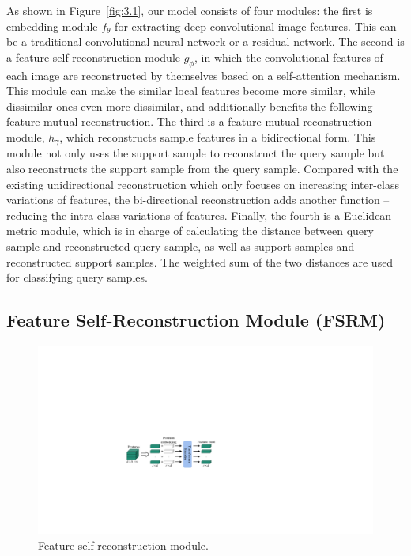 \documentclass[letterpaper]{article} %
\begin{document}
As shown in Figure~\ref{fig:3.1}, our model consists of four modules:
the first is embedding module $f_{\theta}$ for extracting deep convolutional image features. This can be a traditional convolutional neural network or a residual network.
The second is a feature self-reconstruction module $g_{\phi}$, in which the convolutional features of each image are reconstructed by themselves based on a self-attention mechanism.
This module can make the similar local features become more similar, while dissimilar ones even more dissimilar, and additionally benefits the following feature mutual reconstruction.
The third is a feature mutual reconstruction module, $h_{\gamma}$, which reconstructs sample features in a bidirectional form. This module not only uses the support sample to reconstruct the query sample but also reconstructs the support sample from the query sample. Compared with the existing unidirectional reconstruction which only focuses on increasing inter-class variations of features, the bi-directional reconstruction adds another function -- reducing the intra-class variations of features.
Finally, the fourth is a {Euclidean} metric module, which is in charge of calculating the distance between query sample and reconstructed query sample, as well as support samples and reconstructed support samples. The weighted sum of the two distances are used for classifying query samples.





\subsection{Feature Self-Reconstruction Module (FSRM)}





\begin{figure}[htp]
\centering
  \includegraphics[width=0.85\linewidth]{figures/3.2.pdf}
  \caption{Feature self-reconstruction module.}
  \label{fig:3.2}
\end{figure}
\end{document}
